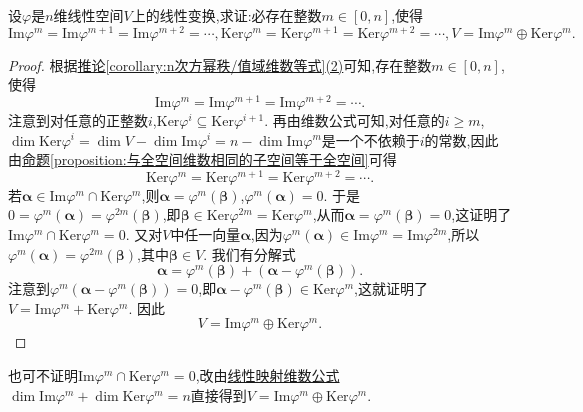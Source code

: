 \documentclass[../../main.tex]{subfiles}%
\begin{document}
\begin{proposition}\label{proposition:线性映射像空间与和空间等式链}
设\(\varphi\)是\(n\)维线性空间\(V\)上的线性变换,求证:必存在整数\(m\in[0,n]\),使得
\[
\text{Im}\varphi^m = \text{Im}\varphi^{m + 1} = \text{Im}\varphi^{m + 2} = \cdots, \text{Ker}\varphi^m = \text{Ker}\varphi^{m + 1} = \text{Ker}\varphi^{m + 2} = \cdots, V = \text{Im}\varphi^m\oplus\text{Ker}\varphi^m.
\]
\end{proposition}
\begin{proof}
根据\hyperref[corollary:n次方幂秩/值域维数等式]{推论\ref{corollary:n次方幂秩/值域维数等式}(2)}可知,存在整数\(m\in[0,n]\),使得
\[
\text{Im}\varphi^m = \text{Im}\varphi^{m + 1} = \text{Im}\varphi^{m + 2} = \cdots.
\]
注意到对任意的正整数\(i\),\(\text{Ker}\varphi^i\subseteq\text{Ker}\varphi^{i + 1}\). 再由维数公式可知,对任意的\(i\geqslant  m\),\(\dim\text{Ker}\varphi^i=\dim V - \dim\text{Im}\varphi^i=n - \dim\text{Im}\varphi^m\)是一个不依赖于\(i\)的常数,因此由\hyperref[proposition:与全空间维数相同的子空间等于全空间]{命题\ref{proposition:与全空间维数相同的子空间等于全空间}}可得
\[
\text{Ker}\varphi^m = \text{Ker}\varphi^{m + 1} = \text{Ker}\varphi^{m + 2} = \cdots.
\]
若\(\boldsymbol{\alpha}\in\text{Im}\varphi^m\cap\text{Ker}\varphi^m\),则\(\boldsymbol{\alpha}=\varphi^m(\boldsymbol{\beta})\),\(\varphi^m(\boldsymbol{\alpha}) = 0\). 于是\(0=\varphi^m(\boldsymbol{\alpha})=\varphi^{2m}(\boldsymbol{\beta})\),即\(\boldsymbol{\beta}\in\text{Ker}\varphi^{2m}=\text{Ker}\varphi^m\),从而\(\boldsymbol{\alpha}=\varphi^m(\boldsymbol{\beta}) = 0\),这证明了\(\text{Im}\varphi^m\cap\text{Ker}\varphi^m = 0\). 又对\(V\)中任一向量\(\boldsymbol{\alpha}\),因为\(\varphi^m(\boldsymbol{\alpha})\in\text{Im}\varphi^m=\text{Im}\varphi^{2m}\),所以\(\varphi^m(\boldsymbol{\alpha})=\varphi^{2m}(\boldsymbol{\beta})\),其中\(\boldsymbol{\beta}\in V\). 我们有分解式
\[
\boldsymbol{\alpha}=\varphi^m(\boldsymbol{\beta})+(\boldsymbol{\alpha}-\varphi^m(\boldsymbol{\beta})).
\]
注意到\(\varphi^m(\boldsymbol{\alpha}-\varphi^m(\boldsymbol{\beta})) = 0\),即\(\boldsymbol{\alpha}-\varphi^m(\boldsymbol{\beta})\in\text{Ker}\varphi^m\),这就证明了\(V=\text{Im}\varphi^m+\text{Ker}\varphi^m\). 因此
\[
V = \text{Im}\varphi^m\oplus\text{Ker}\varphi^m.
\]
\end{proof}
\begin{remark}
也可不证明\(\text{Im}\varphi^m\cap\text{Ker}\varphi^m = 0\),改由\hyperref[theorem:线性映射的维数公式]{线性映射维数公式}\(\dim\text{Im}\varphi^m+\dim\text{Ker}\varphi^m=n\)直接得到\(V=\text{Im}\varphi^m\oplus\text{Ker}\varphi^m\).
\end{remark}
\end{document}
